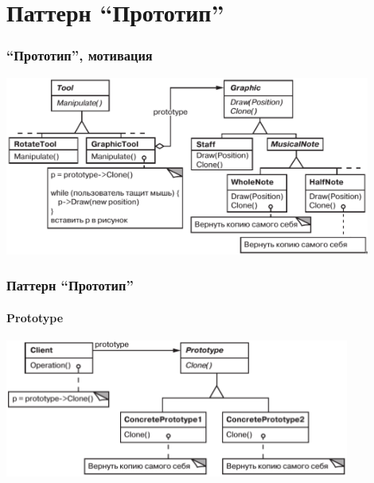 \documentclass{../cscslides}
\begin{document}
    \section{Паттерн ``Прототип''}

    \begin{frame}
        \frametitle{``Прототип'', мотивация}
        \begin{center}
            \includegraphics[width=0.9\textwidth]{musicalEditor.png}
        \end{center}
    \end{frame}

    \begin{frame}
        \frametitle{Паттерн ``Прототип''}
        \framesubtitle{Prototype}
        \begin{center}
            \includegraphics[width=0.85\textwidth]{prototype.png}
        \end{center}
    \end{frame}
    
\end{document}
